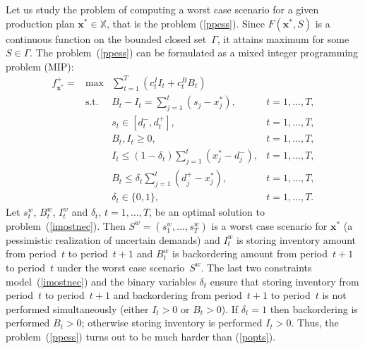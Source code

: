 \documentclass[11pt]{article}
\newcommand{\Xset}{\mathbb{X}}
\begin{document}
Let us study   the problem of computing a worst case 
scenario for a given production plan $\pmb{x}^{*}\in \Xset$, that
is the problem (\ref{ppess}).
Since $F(\pmb{x}^{*},S)$ is a continuous function on the bounded closed set~$\Gamma$,
it attains maximum  for some $S\in\Gamma$.
The problem~(\ref{ppess})
can be formulated as a mixed integer programming problem (MIP):
\begin{equation}
 \begin{array}{llll}
  f_{\pmb{x}^{*}}^{+}=&\max &\sum_{t=1}^{T}(c^I_t I_t+ c^B_t B_t)&\\
&\text{s.t. } & B_t- I_t=\sum_{j=1}^{t}(s_j-x^{*}_j), & t=1,\ldots,T,\\
  &     &s_t\in [d^{-}_t,d^{+}_t],  &t=1,\ldots,T,\\
    &    &B_t,I_t\geq 0,  &t=1,\ldots,T,\\
      &  &I_t\leq (1-\delta_t)\sum_{j=1}^{t}(x^{*}_j-d^{-}_j),  &t=1,\ldots,T,\\
      & &B_t\leq \delta_t\sum_{j=1}^{t}(d^{+}_j-x^{*}_j),  &t=1,\ldots,T,\\
      & & \delta_t\in \{0,1\}, &t=1,\ldots,T.      
 \end{array}
 \label{imostnec}
\end{equation}
Let $s^{w}_t$, $B^{w}_t$, $I^{w}_t$ and $\delta_t$, $t=1,\ldots,T$, be
 an optimal solution to problem~(\ref{imostnec}). Then
$S^{w}=(s^{w}_1,\ldots,s^{w}_T)$ is a worst case scenario for $\pmb{x}^{*}$ 
(a pessimistic realization of uncertain demands)
and 
$I^{w}_t$  is storing inventory amount
from period~$t$ to period~$t+1$ and 
$B^{w}_t$ is backordering amount from period~$t+1$ to
period~$t$ under the worst case scenario~$S^{w}$.
The last two constraints model~(\ref{imostnec})
and the binary variables $\delta_t$ ensure
that storing inventory  from period~$t$ to period~$t+1$
and backordering  from period~$t+1$ to
period~$t$ is not performed simultaneously 
(either $I_t>0$ or $B_t>0$). If $\delta_t=1$ then
backordering is performed $B_t>0$; otherwise 
storing inventory is performed $I_t>0$.
Thus, the problem~(\ref{ppess}) turns out to be much harder than (\ref{popts}).
\end{document}
